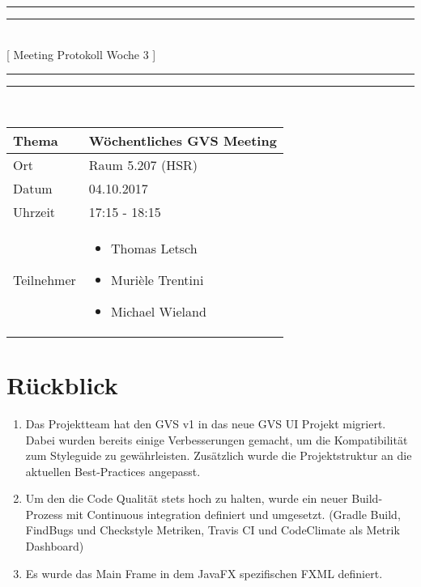 \documentclass[11pt, a4paper,oneside]{scrartcl}
\begin{document}
\centering
\rule{\textwidth}{1.6pt}\vspace*{-\baselineskip}\vspace*{2pt} %
\rule{\textwidth}{0.4pt}\\[\baselineskip] %
{\LARGE [ Meeting Protokoll Woche 3 ]}\\[0.2\baselineskip] %
\rule{\textwidth}{0.4pt}\vspace*{-\baselineskip}\vspace{3.2pt} %
\rule{\textwidth}{1.6pt}\\[2\baselineskip] %

\begin{tabu} to \linewidth {l X }
	\toprule
	\textbf{Thema} & \textbf{Wöchentliches GVS Meeting} \\
	\midrule
	Ort & Raum 5.207 (HSR) \\
	Datum & 04.10.2017 \\
	Uhrzeit & 17:15 - 18:15 \\
	Teilnehmer & 
	\begin{minipage}[t]{\textwidth}
	  	\begin{itemize}
	  		\item Thomas Letsch
			\item Murièle Trentini
			\item Michael Wieland
	  	\end{itemize}
	\end{minipage}
	\\
	\bottomrule
\end{tabu}


\section{Rückblick}
\begin{enumerate}
	\item Das Projektteam hat den GVS v1 in das neue GVS UI Projekt migriert. Dabei wurden bereits einige Verbesserungen gemacht, um die Kompatibilität zum Styleguide zu gewährleisten. Zusätzlich wurde die Projektstruktur an die aktuellen Best-Practices angepasst.
	\item Um den die Code Qualität stets hoch zu halten, wurde ein neuer Build-Prozess mit Continuous integration definiert und umgesetzt. (Gradle Build, FindBugs und Checkstyle Metriken, Travis CI und CodeClimate als Metrik Dashboard)
	\item Es wurde das Main Frame in dem JavaFX spezifischen FXML definiert.
\end{enumerate}
\end{document}
